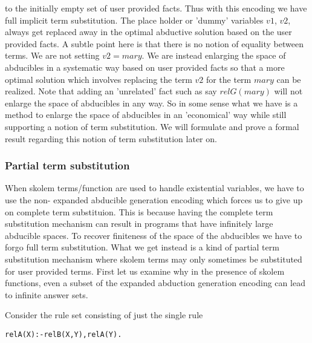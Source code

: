 to the initially empty set of user provided facts. Thus with this encoding we
have full implicit term substitution. The place holder or 'dummy' variables
$v1$, $v2$, always get replaced away in the optimal abductive solution based
on the user provided facts.
A subtle point here is that there is no notion of
equality between terms. We are not setting $v2 = mary$. We are instead
enlarging the space of abducibles in a systematic way based on user provided
facts so that a more optimal solution which involves replacing the term $v2$
for the term $mary$ can be realized. Note that adding an 'unrelated' fact such
as say $relG(mary)$ will not enlarge the space of abducibles in any way. So in
some sense what we have is a method to enlarge the space of abducibles in an
'economical' way while still supporting a notion of term substitution. We will
formulate and prove a formal result regarding this notion of term substitution
later on.

\subsubsection{Partial term substitution}

When skolem terms/function are used to handle existential variables, we have
to use the non- expanded abducible generation encoding which forces us to give
up on complete term substituion.  This is because having the complete term
substitution mechanism can result in programs that have infinitely large
abducible spaces. To recover finiteness of the space of the abducibles we have
to forgo full term substitution. What we get instead is a kind of partial term
substitution mechanism where skolem terms may only sometimes be substituted
for user provided terms.  First let us examine why in the presence of skolem
functions, even a subset of the expanded abduction generation encoding can
lead to infinite answer sets.

Consider the rule set consisting of just the single rule 
\begin{lstlisting}[frame=none]
relA(X):-relB(X,Y),relA(Y).
\end{lstlisting}

